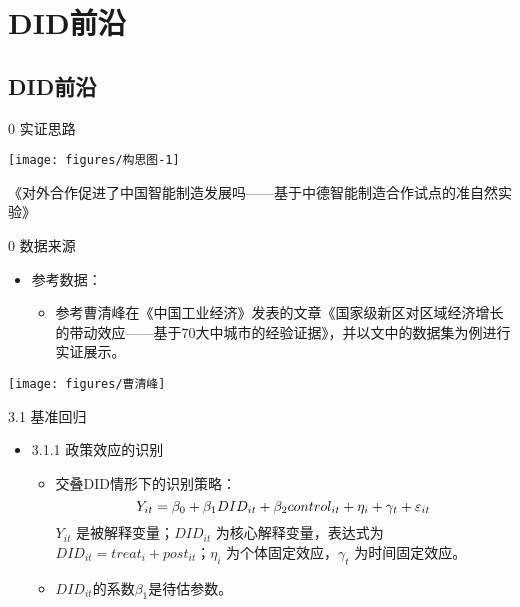 \documentclass{beamer}%
\begin{document}
\section{DID前沿}  %
\subsection*{DID前沿}
\begin{frame}[t]{\large 0 实证思路}
\begin{center}
		\texttt{[image: figures/构思图-1]}
\end{center}
\begin{center}
\small 《对外合作促进了中国智能制造发展吗——基于中德智能制造合作试点的准自然实验》
\end{center}
\end{frame}



\begin{frame}[t]{\large 0 数据来源}
\begin{itemize}
  \item 参考数据：
\begin{itemize}
  \item 参考曹清峰在《中国工业经济》发表的文章《国家级新区对区域经济增长的带动效应——基于70大中城市的经验证据》，并以文中的数据集为例进行实证展示。
\end{itemize}
\end{itemize}
\vspace{-0.4cm} %
\begin{center}
		\texttt{[image: figures/曹清峰]}
\end{center}
\end{frame}




\begin{frame}[t]{\large 3.1 基准回归}
\begin{itemize}
  \item 3.1.1 政策效应的识别
  \begin{itemize}
  \item 交叠DID情形下的识别策略：
  \begin{equation}
  \setlength{\abovedisplayskip}{4pt}
  \setlength{\belowdisplayskip}{4pt}
    Y_{it}=\beta_{0}+\beta_1 DID_{it}+\beta_2 control_{i t}+\eta_i+\gamma_t+\varepsilon_{it}
  \end{equation}
  $Y_{it}$ 是被解释变量；$DID_{it}$ 为核心解释变量，表达式为$DID_{it}=treat_i+post_{it}$；$\eta_i $ 为个体固定效应，$\gamma_t $ 为时间固定效应。

  \item $DID_{it}$的系数$\beta_1$是待估参数。
  \end{itemize}
\end{itemize}
\end{frame}
\end{document}
